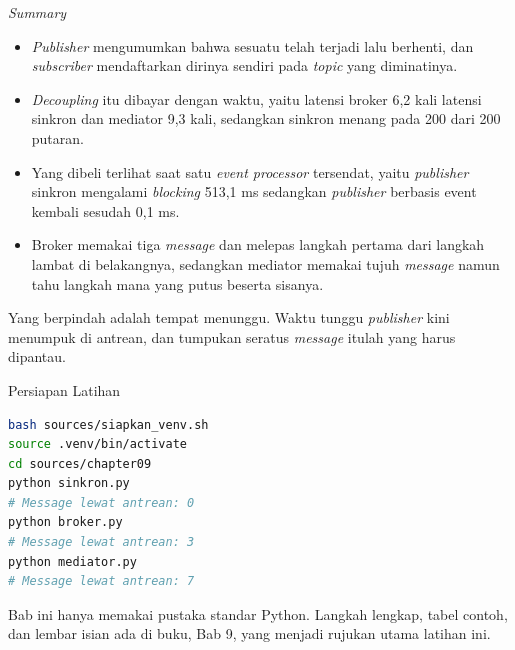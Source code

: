 \documentclass[aspectratio=169, table, 12pt]{beamer}
\begin{document}
\begin{frame}{{\Large \textit{Summary}}}
  \vspace{10pt}
  \begin{itemize}\small
    \item \textit{Publisher} mengumumkan bahwa sesuatu telah terjadi lalu berhenti, dan
          \textit{subscriber} mendaftarkan dirinya sendiri pada \textit{topic} yang diminatinya.
    \item \textit{Decoupling} itu dibayar dengan waktu, yaitu latensi broker 6,2 kali
          latensi sinkron dan mediator 9,3 kali, sedangkan sinkron menang pada
          200 dari 200 putaran.
    \item Yang dibeli terlihat saat satu \textit{event processor} tersendat, yaitu \textit{publisher}
          sinkron mengalami \textit{blocking} 513,1 ms sedangkan \textit{publisher} berbasis event kembali
          sesudah 0,1 ms.
    \item Broker memakai tiga \textit{message} dan melepas langkah pertama dari langkah
          lambat di belakangnya, sedangkan mediator memakai tujuh \textit{message} namun
          tahu langkah mana yang putus beserta sisanya.
  \end{itemize}

  \vspace{10pt}
  {\small Yang berpindah adalah tempat menunggu. Waktu tunggu \textit{publisher} kini
  menumpuk di antrean, dan tumpukan seratus \textit{message} itulah yang harus
  dipantau.}
\end{frame}

\begin{frame}[fragile]{{\Large Persiapan Latihan}}
  \vspace{5pt}
\begin{lstlisting}[language=bash]
bash sources/siapkan_venv.sh
source .venv/bin/activate
cd sources/chapter09
python sinkron.py
# Message lewat antrean: 0
python broker.py
# Message lewat antrean: 3
python mediator.py
# Message lewat antrean: 7
\end{lstlisting}

  \vspace{6pt}
  {\small Bab ini hanya memakai pustaka standar Python. Langkah lengkap, tabel
  contoh, dan lembar isian ada di buku, Bab 9, yang menjadi rujukan utama
  latihan ini.}
\end{frame}
\end{document}

